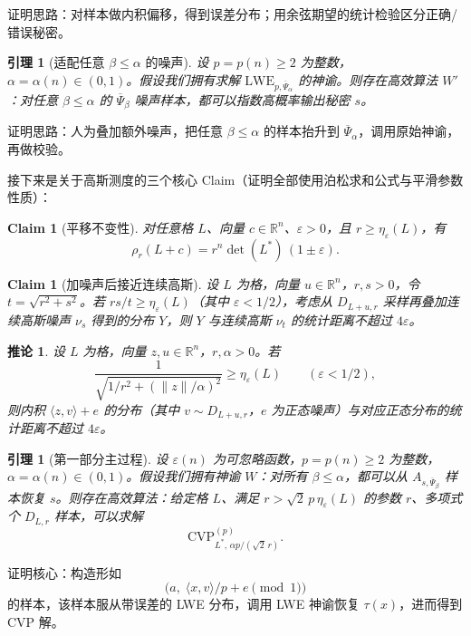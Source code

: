 \documentclass[11pt,a4paper]{article}
\newtheorem{lemma}[theorem]{引理}
\newtheorem{claim}[theorem]{Claim}
\newtheorem{corollary}[theorem]{推论}
\newcommand{\R}{\mathbb{R}}
\newcommand{\Psibar}{\overline{\Psi}}
\begin{document}
证明思路：对样本做内积偏移，得到误差分布；用余弦期望的统计检验区分正确/错误秘密。

\begin{lemma}[适配任意 $\beta\le\alpha$ 的噪声]
设 $p=p(n)\ge 2$ 为整数，$\alpha=\alpha(n)\in(0,1)$。假设我们拥有求解 $\mathrm{LWE}_{p,\Psibar_{\alpha}}$ 的神谕。则存在高效算法 $W'$：对任意 $\beta\le\alpha$ 的 $\Psibar_{\beta}$ 噪声样本，都可以指数高概率输出秘密 $s$。
\end{lemma}

证明思路：人为叠加额外噪声，把任意 $\beta\le\alpha$ 的样本抬升到 $\Psibar_{\alpha}$，调用原始神谕，再做校验。

接下来是关于高斯测度的三个核心 Claim（证明全部使用泊松求和公式与平滑参数性质）：

\begin{claim}[平移不变性]
对任意格 $L$、向量 $c\in\R^{n}$、$\varepsilon>0$，且 $r\ge\eta_{\varepsilon}(L)$，有
\[
  \rho_{r}(L+c)=r^{n}\det(L^{*})\,(1\pm\varepsilon).
\]
\end{claim}

\begin{claim}[加噪声后接近连续高斯]
设 $L$ 为格，向量 $u\in\R^{n}$，$r,s>0$，令 $t=\sqrt{r^{2}+s^{2}}$。若 $rs/t\ge\eta_{\varepsilon}(L)$（其中 $\varepsilon<1/2$），考虑从 $D_{L+u,r}$ 采样再叠加连续高斯噪声 $\nu_{s}$ 得到的分布 $Y$，则 $Y$ 与连续高斯 $\nu_{t}$ 的统计距离不超过 $4\varepsilon$。
\end{claim}

\begin{corollary}
设 $L$ 为格，向量 $z,u\in\R^{n}$，$r,\alpha>0$。若
\[
  \frac{1}{\sqrt{1/r^{2}+(\lVert z\rVert/\alpha)^{2}}}\ge \eta_{\varepsilon}(L)
  \qquad(\varepsilon<1/2),
\]
则内积 $\langle z,v\rangle+e$ 的分布（其中 $v\sim D_{L+u,r}$，$e$ 为正态噪声）与对应正态分布的统计距离不超过 $4\varepsilon$。
\end{corollary}

\begin{lemma}[第一部分主过程]
设 $\varepsilon(n)$ 为可忽略函数，$p=p(n)\ge 2$ 为整数，$\alpha=\alpha(n)\in(0,1)$。假设我们拥有神谕 $W$：对所有 $\beta\le\alpha$，都可以从 $A_{s,\Psibar_{\beta}}$ 样本恢复 $s$。则存在高效算法：给定格 $L$、满足 $r>\sqrt{2}\,p\,\eta_{\varepsilon}(L)$ 的参数 $r$、多项式个 $D_{L,r}$ 样本，可以求解
\[
  \mathrm{CVP}^{(p)}_{L^{*},\,\alpha p/(\sqrt{2}\,r)}.
\]
\end{lemma}

证明核心：构造形如
\[
  \bigl(a,\;\langle x,v\rangle/p+e\pmod{1}\bigr)
\]
的样本，该样本服从带误差的 LWE 分布，调用 LWE 神谕恢复 $\tau(x)$，进而得到 CVP 解。
\end{document}
